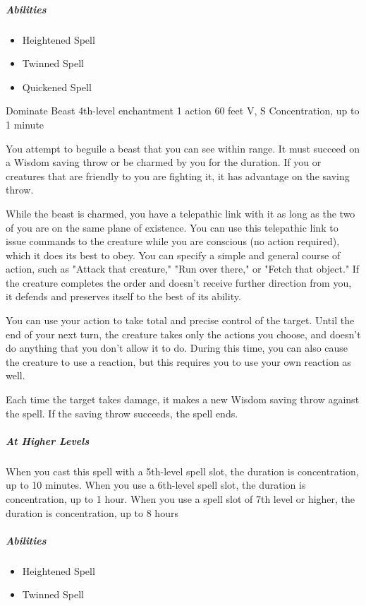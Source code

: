 \documentclass[a4paper,openany,twocolumn]{book}
\begin{document}
\subparagraph*{Abilities}
\begin{itemize}
  \item Heightened Spell
  \item Twinned Spell
  \item Quickened Spell
\end{itemize}

\DndSpellHeader
  {Dominate Beast}
  {4th-level enchantment}
  {1 action}
  {60 feet}
  {V, S}
  {Concentration, up to 1 minute}

You attempt to beguile a beast that you can see within range. It must succeed on a Wisdom saving throw or be charmed by you for the duration. If you or creatures that are friendly to you are fighting it, it has advantage on the saving throw. 
    
While the beast is charmed, you have a telepathic link with it as long as the two of you are on the same plane of existence. You can use this telepathic link to issue commands to the creature while you are conscious (no action required), which it does its best to obey. You can specify a simple and  general course of action, such as "Attack that creature," "Run over there," or  "Fetch that object." If the creature completes the order and doesn't receive further direction from you, it defends and preserves itself to the best of its ability. 
    
You can use your action to take total and precise control of the  target. Until the end of your next turn, the creature takes only the actions you choose, and doesn't do anything that you don't allow it to do. During this time, you can also cause the creature to use a reaction, but this requires you to use your own reaction as well. 
    
Each time the target takes damage, it makes a new Wisdom saving throw against the spell. If the saving throw succeeds, the spell ends.
    
\subparagraph*{At Higher Levels} When you cast this spell with a 5th-level spell slot, the duration is concentration, up to 10 minutes.  When you use a 6th-level spell slot, the duration is concentration, up to 1 hour. When you use a spell slot of 7th level or higher, the duration is concentration, up to 8 hours

\subparagraph*{Abilities}
\begin{itemize}
  \item Heightened Spell
  \item Twinned Spell
\end{itemize}
\end{document}
